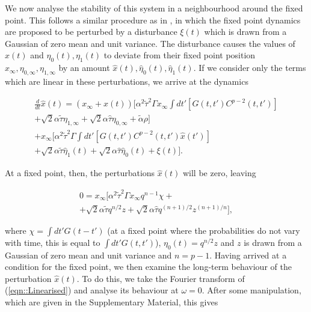 \documentclass[sigconf,anonymous]{aamas}
\newcommand{\talpha}{\tilde{\alpha}}
\newcommand{\ttau}{\tilde{\tau}}
\newcommand{\htau}{\hat{\tau}}
\newcommand{\xfixed}{x_\infty}
\newcommand{\ezerof}{\eta_{0, \infty}}
\newcommand{\eonef}{\eta_{1, \infty}}
\newcommand{\xpert}{\hat{x}(t)}
\newcommand{\xpertdash}{\hat{x}(t')}
\newcommand{\ezeropert}{\hat{\eta}_0(t)}
\newcommand{\eonepert}{\hat{\eta}_1(t)}
\begin{document}
We now analyse the stability of this system in a neighbourhood around the fixed point. This follows a similar procedure as in \cite{Opper1992}, in which the fixed point dynamics are proposed to be perturbed by a disturbance $\xi(t)$ which is drawn from a Gaussian of zero mean and unit variance. The disturbance causes the values of $x(t)$ and $\eta_0(t), \eta_1(t)$ to deviate from their fixed point position $\xfixed, \ezerof, \eonef$ by an amount $\xpert, \ezeropert, \eonepert$.
If we consider only the terms which are linear in these perturbations, we arrive at the dynamics

\begin{equation}
\label{eqn::Linearised}
    \begin{split}
        \frac{d}{dt} \xpert = (\xfixed + \xpert) [ \alpha^2 \ttau^2 \Gamma \xfixed \int dt' [ G(t, t')C^{p - 2}(t, t') ]\\ + \sqrt{2} \alpha \ttau \eonef + \sqrt{2} \alpha \htau \ezerof + \talpha \rho] \\
        + \xfixed [\alpha^2 \ttau^2 \Gamma \int dt' [ G(t, t')C^{p - 2}(t, t') \xpertdash ] \\ + \sqrt{2} \alpha \ttau \eonepert + \sqrt{2} \alpha \htau \ezeropert + \xi(t)].
    \end{split}
\end{equation}

At a fixed point, then, the perturbations $\xpert$ will be zero, leaving

\begin{equation}
    \begin{split}
    \label{eqn::fixed_point}
        0 = \xfixed [ \alpha^2 \ttau^2 \Gamma \xfixed q^{n-1} \chi + \\ + \sqrt{2} \alpha \ttau q^{n/2}z + \sqrt{2} \alpha \htau q^{(n+1)/2} z^{(n+1)/n}],
    \end{split}
\end{equation}

where $\chi = \int dt' G(t - t')$ (at a fixed point where the probabilities do not vary with time, this is equal to $\int dt' G(t, t')$), $\eta_0(t) = q^{n/2}z$ and $z$ is drawn from a Gaussian of zero mean and unit variance and $n = p - 1$. Having arrived at a condition for the fixed point, we then examine the long-term behaviour of the perturbation $\xpert$. To do this, we take the Fourier transform of (\ref{eqn::Linearised}) and analyse its behaviour at $\omega = 0$. After some manipulation, which are given in the Supplementary Material, this gives
\end{document}
